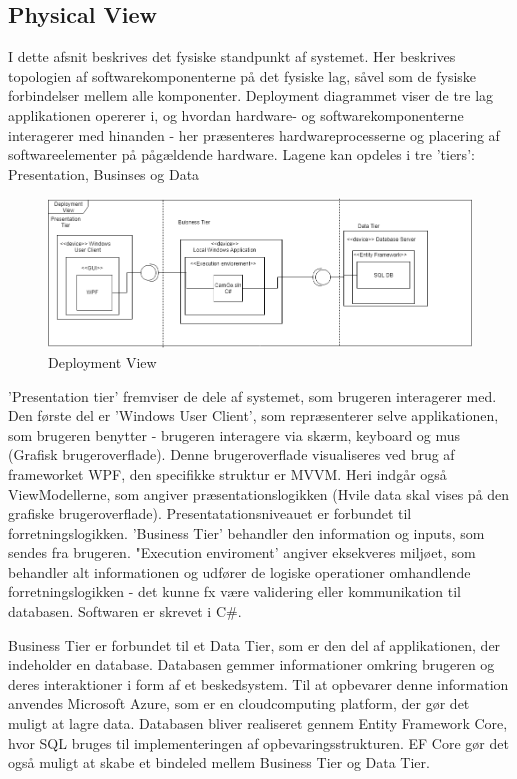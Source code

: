 \documentclass[Rapport/Rapport_main.tex]{subfiles}
\begin{document}
\subsection{Physical View}
I dette afsnit beskrives det fysiske standpunkt af systemet. Her beskrives topologien af softwarekomponenterne på det fysiske lag, såvel som de fysiske forbindelser mellem alle komponenter. Deployment diagrammet viser de tre lag applikationen opererer i, og hvordan hardware- og softwarekomponenterne interagerer med hinanden - her præsenteres hardwareprocesserne og placering af softwareelementer på pågældende hardware. Lagene kan opdeles i tre 'tiers': Presentation, Businses og Data 
\begin{figure}[H]
    \centering
    \includegraphics[width=\linewidth]{Arkitektur/4+1View/Graphics/DeploymentDiagram.png}
    \caption{Deployment View}
    \label{fig:deployment}
\end{figure}
'Presentation tier' fremviser de dele af systemet, som brugeren interagerer med. Den første del er 'Windows User Client', som repræsenterer selve applikationen, som brugeren benytter - brugeren interagere via skærm, keyboard og mus (Grafisk brugeroverflade). Denne brugeroverflade visualiseres ved brug af frameworket WPF, den specifikke struktur er MVVM. Heri indgår også ViewModellerne, som angiver præsentationslogikken (Hvile data skal vises på den grafiske brugeroverflade). Presentatationsniveauet er forbundet til forretningslogikken. 'Business Tier' behandler den information og inputs, som sendes fra brugeren. "Execution enviroment' angiver eksekveres miljøet, som behandler alt informationen og udfører de logiske operationer omhandlende forretningslogikken - det kunne fx være validering eller kommunikation til databasen. Softwaren er skrevet i C\#.  

Business Tier er forbundet til et Data Tier, som er den del af applikationen, der indeholder en database. Databasen gemmer informationer omkring brugeren og deres interaktioner i form af et beskedsystem. Til at opbevarer denne information anvendes Microsoft Azure, som er en cloudcomputing platform, der gør det muligt at lagre data. Databasen bliver realiseret gennem Entity Framework Core, hvor SQL bruges til implementeringen af opbevaringsstrukturen. EF Core gør det også muligt at skabe et bindeled mellem Business Tier og Data Tier. 
\end{document}
